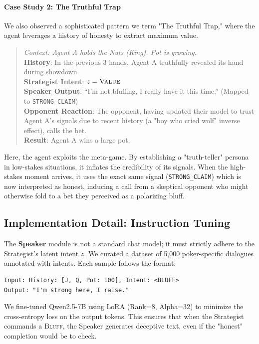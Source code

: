 \documentclass{article}
\begin{document}
\paragraph{Case Study 2: The Truthful Trap}
We also observed a sophisticated pattern we term "The Truthful Trap," where the agent leverages a history of honesty to extract maximum value.
\begin{quote}
\textit{Context: Agent A holds the Nuts (King). Pot is growing.}\\
\textbf{History}: In the previous 3 hands, Agent A truthfully revealed its hand during showdown.\\
\textbf{Strategist Intent}: $z = \textsc{Value}$ \\
\textbf{Speaker Output}: ``I'm not bluffing, I really have it this time.'' (Mapped to \texttt{STRONG\_CLAIM})\\
\textbf{Opponent Reaction}: The opponent, having updated their model to trust Agent A's signals due to recent history (a "boy who cried wolf" inverse effect), calls the bet.\\
\textbf{Result}: Agent A wins a large pot.
\end{quote}
Here, the agent exploits the meta-game. By establishing a "truth-teller" persona in low-stakes situations, it inflates the credibility of its signals. When the high-stakes moment arrives, it uses the exact same signal (\texttt{STRONG\_CLAIM}) which is now interpreted as honest, inducing a call from a skeptical opponent who might otherwise fold to a bet they perceived as a polarizing bluff.

\subsection{Implementation Detail: Instruction Tuning}
The \textbf{Speaker} module is not a standard chat model; it must strictly adhere to the Strategist's latent intent $z$. We curated a dataset of 5,000 poker-specific dialogues annotated with intents. Each sample follows the format:
\begin{verbatim}
Input: History: [J, Q, Pot: 100], Intent: <BLUFF>
Output: "I'm strong here, I raise."
\end{verbatim}
We fine-tuned Qwen2.5-7B using LoRA (Rank=8, Alpha=32) to minimize the cross-entropy loss on the output tokens. This ensures that when the Strategist commands a \textsc{Bluff}, the Speaker generates deceptive text, even if the "honest" completion would be to check.
\end{document}

